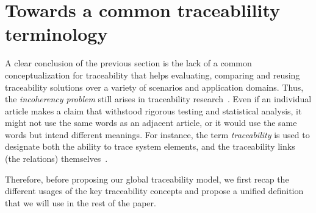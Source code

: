 \section{Towards a common traceablility terminology}\label{sec:terminology}

A clear conclusion of the previous section is the lack of a common conceptualization for traceability that helps evaluating, comparing and reusing traceability solutions over a variety of scenarios and application domains. Thus, the \textit{incoherency problem} still arises in traceability research~\cite{watts2017-incoherency-problem}. Even if an individual article makes a claim that withstood rigorous testing and statistical analysis, it might not use the same words as an adjacent article, or it would use the same words but intend different meanings.
For instance, the term \textit{traceability} is used to designate both the ability to trace system elements, and the traceability links (the relations) themselves~\cite{bouillon2013-survey-on-usage-scenario-requirements-traceability-in-practice,antoniol2017-traceability-grand-challenges}.

Therefore, before proposing our global traceability model, we first recap the different usages of the key traceability concepts and propose a unified definition that we will use in the rest of the paper. 



